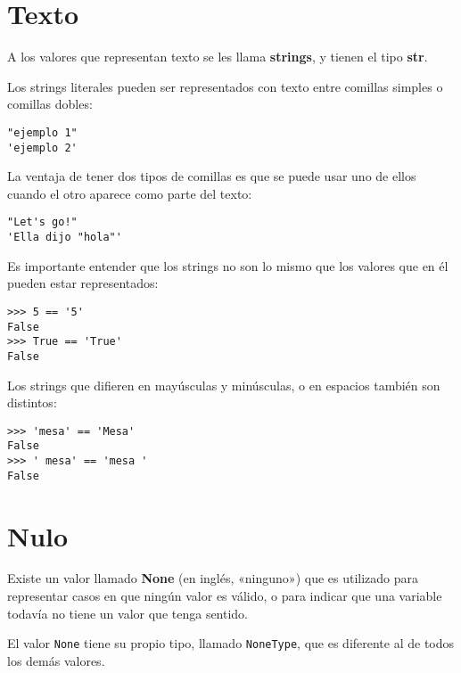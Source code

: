 \section{Texto}

A los valores que representan texto se les llama \textbf{strings}, y
tienen el tipo \textbf{str}.

Los strings literales pueden ser representados con texto entre comillas
simples o comillas dobles:

\begin{lstlisting}
"ejemplo 1"
'ejemplo 2'
\end{lstlisting}

La ventaja de tener dos tipos de comillas es que se puede usar uno de
ellos cuando el otro aparece como parte del texto:

\begin{lstlisting}
"Let's go!"
'Ella dijo "hola"'
\end{lstlisting}

Es importante entender que los strings no son lo mismo que los valores
que en él pueden estar representados:

\begin{lstlisting}
>>> 5 == '5'
False
>>> True == 'True'
False
\end{lstlisting}

Los strings que difieren en mayúsculas y minúsculas, o en espacios
también son distintos:

\begin{lstlisting}
>>> 'mesa' == 'Mesa'
False
>>> ' mesa' == 'mesa '
False
\end{lstlisting}

\section{Nulo}

Existe un valor llamado \textbf{None} (en inglés, «ninguno») que es
utilizado para representar casos en que ningún valor es válido, o para
indicar que una variable todavía no tiene un valor que tenga sentido.

El valor \lstinline!None! tiene su propio tipo, llamado
\lstinline!NoneType!, que es diferente al de todos los demás valores.
